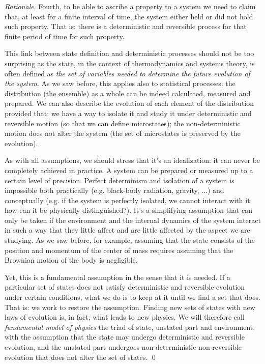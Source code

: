 \documentclass[aps,pra,10pt,twocolumn,floatfix,nofootinbib]{revtex4-1}
\theoremstyle{definition}
\newenvironment{rationale}{\emph{Rationale}.}{\qed}
\begin{document}
\begin{rationale}
Fourth, to be able to ascribe a property to a system we need to claim that, at least for a finite interval of time, the system either held or did not hold such property. That is: there is a deterministic and reversible process for that finite period of time for such property.

This link between state definition and deterministic processes should not be too surprising as the state, in the context of thermodynamics and systems theory, is often defined as \emph{the set of variables needed to determine the future evolution of the system}. As we saw before, this applies also to statistical processes: the distribution (the ensemble) as a whole can be indeed calculated, measured and prepared. We can also describe the evolution of each element of the distribution provided that: we have a way to isolate it and study it under deterministic and reversible motion (so that we can define microstates); the non-deterministic motion does not alter the system (the set of microstates is preserved by the evolution).

As with all assumptions, we should stress that it's an idealization: it can never be completely achieved in practice. A system can be prepared or measured up to a certain level of precision. Perfect determinism and isolation of a system is impossible both practically (e.g. black-body radiation, gravity, ...) and conceptually (e.g. if the system is perfectly isolated, we cannot interact with it: how can it be physically distinguished?). It's a simplifying assumption that can only be taken if the environment and the internal dynamics of the system interact in such a way that they little affect and are little affected by the aspect we are studying. As we saw before, for example, assuming that the state consists of the position and momentum of the center of mass requires assuming that the Brownian motion of the body is negligible.

Yet, this is a fundamental assumption in the sense that it is needed. If a particular set of states does not satisfy deterministic and reversible evolution under certain conditions, what we do is to keep at it until we find a set that does. That is: we work to restore the assumption. Finding new sets of states with new laws of evolution is, in fact, what leads to new physics. We will therefore call \emph{fundamental model of physics} the triad of state, unstated part and environment, with the assumption that the state may undergo deterministic and reversible evolution, and the unstated part undergoes non-deterministic non-reversible evolution that does not alter the set of states.
\end{rationale}
\end{document}
